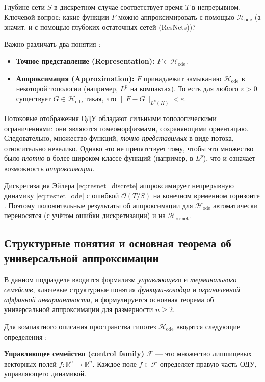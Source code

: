 \documentclass[../NDCNNAI_main.tex]{subfiles}
\begin{document}
Глубине сети $S$ в дискретном случае соответствует время $T$ в непрерывном. Ключевой вопрос: какие функции $F$ можно аппроксимировать с помощью $\mathcal{H}_{\text{ode}}$ (а значит, и с помощью глубоких остаточных сетей (ResNets))?

Важно различать два понятия \cite[Раздел 1.4]{Li2023DeepLD}:
\begin{itemize}
    \item \textbf{Точное представление (Representation):} $F \in \mathcal{H}_{\text{ode}}$.
    \item \textbf{Аппроксимация (Approximation):} $F$ принадлежит замыканию $\mathcal{H}_{\text{ode}}$ в некоторой топологии (например, $L^p$ на компактах). То есть для любого $\varepsilon > 0$ существует $G \in \mathcal{H}_{\text{ode}}$ такая, что $\|F - G\|_{L^p(K)} < \varepsilon$.
\end{itemize}

Потоковые отображения ОДУ обладают сильными топологическими ограничениями: они являются гомеоморфизмами, сохраняющими ориентацию. Следовательно, множество функций, \emph{точно представимых} в виде потока, относительно невелико. Однако это не препятствует тому, чтобы это множество было \emph{плотно} в более широком классе функций (например, в $L^p$), что и означает возможность \emph{аппроксимации}.

Дискретизация Эйлера \eqref{eq:resnet_discrete} аппроксимирует непрерывную динамику \eqref{eq:resnet_ode} с ошибкой $\mathcal{O}(T/S)$ на конечном временном горизонте \cite[Раздел 1.4]{Li2023DeepLD}. Поэтому положительные результаты об аппроксимации для $\mathcal{H}_{\text{ode}}$ автоматически переносятся (с учётом ошибки дискретизации) и на $\mathcal{H}_{\text{resnet}}$.

\subsection{Структурные понятия и основная теорема об универсальной аппроксимации}

В данном подразделе вводится формализм \emph{управляющего} и \emph{терминального семейств}, ключевые структурные понятия \emph{функции-колодца} и \emph{ограниченной аффинной инвариантности}, и формулируется основная теорема об универсальной аппроксимации для размерности $n \geq 2$.


Для компактного описания пространства гипотез $\mathcal{H}_{\text{ode}}$ вводятся следующие определения \cite[Раздел 2.1]{Li2023DeepLD}:

\begin{definition}
\textbf{Управляющее семейство (control family)} $\mathcal{F}$ --- это множество липшицевых векторных полей $f\colon \mathbb{R}^n \to \mathbb{R}^n$. Каждое поле $f \in \mathcal{F}$ определяет правую часть ОДУ, управляющего динамикой.
\end{definition}
\end{document}
